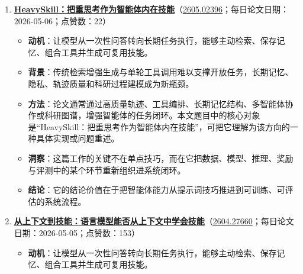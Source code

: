 \begin{enumerate}[leftmargin=1.5em]
  \begin{itemize}[leftmargin=1.5em]
    \item \textbf{动机}：让模型从一次性问答转向长期任务执行，能够主动检索、保存记忆、组合工具并生成可复用技能。
    \item \textbf{背景}：传统检索增强生成与单轮工具调用难以支撑开放任务，长期记忆、隐私、轨迹质量和科研过程建模成为新瓶颈。
    \item \textbf{方法}：论文通常通过高质量轨迹、工具编排、长期记忆结构、多智能体协作或科研图谱，增强智能体的任务闭环。本文题目中的核心对象是“OpenSeeker-v2：用高信息量困难轨迹推进搜索智能体边界”，可把它理解为该方向的一种具体实现或问题重述。
    \item \textbf{洞察}：搜索能力的关键不只是召回相似文本，而是智能体如何与语料、工具和反馈形成闭环。
    \item \textbf{结论}：它的结论价值在于把智能体能力从提示词技巧推进到可训练、可评估的系统流程。
  \end{itemize}
  \item \textbf{\href{https://huggingface.co/papers/2605.02396}{HeavySkill：把重思考作为智能体内在技能}}（\href{https://arxiv.org/abs/2605.02396}{2605.02396}；每日论文日期：2026-05-06；点赞数：22）
  \begin{itemize}[leftmargin=1.5em]
    \item \textbf{动机}：让模型从一次性问答转向长期任务执行，能够主动检索、保存记忆、组合工具并生成可复用技能。
    \item \textbf{背景}：传统检索增强生成与单轮工具调用难以支撑开放任务，长期记忆、隐私、轨迹质量和科研过程建模成为新瓶颈。
    \item \textbf{方法}：论文通常通过高质量轨迹、工具编排、长期记忆结构、多智能体协作或科研图谱，增强智能体的任务闭环。本文题目中的核心对象是“HeavySkill：把重思考作为智能体内在技能”，可把它理解为该方向的一种具体实现或问题重述。
    \item \textbf{洞察}：这篇工作的关键不在单点技巧，而在它把数据、模型、推理、奖励与评测中的某个环节重新组织进系统闭环。
    \item \textbf{结论}：它的结论价值在于把智能体能力从提示词技巧推进到可训练、可评估的系统流程。
  \end{itemize}
  \item \textbf{\href{https://huggingface.co/papers/2604.27660}{从上下文到技能：语言模型能否从上下文中学会技能}}（\href{https://arxiv.org/abs/2604.27660}{2604.27660}；每日论文日期：2026-05-05；点赞数：153）
  \begin{itemize}[leftmargin=1.5em]
    \item \textbf{动机}：让模型从一次性问答转向长期任务执行，能够主动检索、保存记忆、组合工具并生成可复用技能。

\end{itemize}
\end{enumerate}
